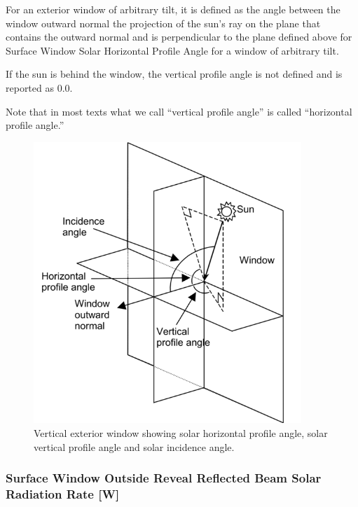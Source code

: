 For an exterior window of arbitrary tilt, it is defined as the angle between the window outward normal the projection of the sun's ray on the plane that contains the outward normal and is perpendicular to the plane defined above for Surface Window Solar Horizontal Profile Angle for a window of arbitrary tilt.

If the sun is behind the window, the vertical profile angle is not defined and is reported as 0.0.

Note that in most texts what we call ``vertical profile angle'' is called ``horizontal profile angle.''

\begin{figure}[hbtp] %
\centering
\includegraphics[width=0.9\textwidth, height=0.9\textheight, keepaspectratio=true]{media/image058.png}
\caption{Vertical exterior window showing solar horizontal profile angle, solar vertical profile angle and solar incidence angle. \protect \label{fig:vertical-exterior-window-showing-solar}}
\end{figure}

\subsubsection{Surface Window Outside Reveal Reflected Beam Solar Radiation Rate {[}W{]}}\label{surface-window-outside-reveal-reflected-beam-solar-radiation-rate-w}

